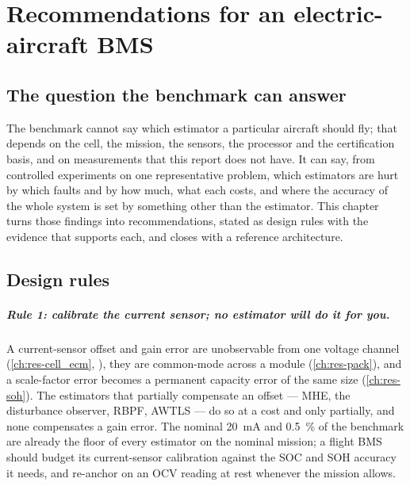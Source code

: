 \chapter{Recommendations for an electric-aircraft BMS}
\label{ch:res-recommendations}

\section{The question the benchmark can answer}

The benchmark cannot say which estimator a particular aircraft should fly; that depends on the
cell, the mission, the sensors, the processor and the certification basis, and on measurements
that this report does not have. It can say, from controlled experiments on one representative
problem, which estimators are hurt by which faults and by how much, what each costs, and where
the accuracy of the whole system is set by something other than the estimator. This chapter
turns those findings into recommendations, stated as design rules with the evidence that
supports each, and closes with a reference architecture.

\section{Design rules}

\paragraph{Rule 1: calibrate the current sensor; no estimator will do it for you.}
A current-sensor offset and gain error are unobservable from one voltage channel
(\cref{ch:res-cell_ecm}, ), they are common-mode across a module
(\cref{ch:res-pack}), and a scale-factor error becomes a permanent capacity error of the same
size (\cref{ch:res-soh}). The estimators that partially compensate an offset --- MHE, the
disturbance observer, RBPF, AWTLS --- do so at a cost and only partially, and none compensates
a gain error. The nominal \SI{20}{\milli\ampere} and \SI{0.5}{\percent} of the benchmark are
already the floor of every estimator on the nominal mission; a flight BMS should budget its
current-sensor calibration against the SOC and SOH accuracy it needs, and re-anchor on an
OCV reading at rest whenever the mission allows.

